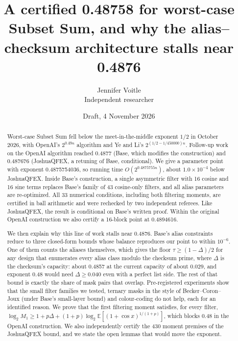 \documentclass[11pt]{article}
\newcommand{\E}{\mathbb{E}}
\theoremstyle{plain}
\begin{document}
\title{A certified 0.48758 for worst-case Subset Sum, and why the alias--checksum architecture stalls near 0.4876}
\author{Jennifer Voitle\\ Independent researcher}
\date{Draft, 4 November 2026}

\maketitle

\begin{abstract}
Worst-case Subset Sum fell below the meet-in-the-middle exponent $1/2$ in October 2026, with OpenAI's $2^{0.49n}$ algorithm and Ye and Li's $2^{(1/2 - 1/450000)n}$. Follow-up work on the OpenAI algorithm reached 0.4877 (Base, which modifies the construction) and 0.487676 (JoshuaQFEX, a retuning of Base, conditional). We give a parameter point with exponent 0.4875754036, so running time $O(2^{0.4875755n})$, about $1.0\times10^{-4}$ below JoshuaQFEX. Inside Base's construction, a single asymmetric filter with 16 cosine and 16 sine terms replaces Base's family of 43 cosine-only filters, and all alias parameters are re-optimized. All 33 numerical conditions, including both filtering moments, are certified in ball arithmetic and were rechecked by two independent referees. Like JoshuaQFEX, the result is conditional on Base's written proof. Within the original OpenAI construction we also certify a 16-block point at 0.4894616.

We then explain why this line of work stalls near 0.4876. Base's alias constraints reduce to three closed-form bounds whose balance reproduces our point to within $10^{-6}$. One of them counts the aliases themselves, which gives the floor $\tau \ge (1 - \Delta)/2$ for any design that enumerates every alias class modulo the checksum prime, where $\Delta$ is the checksum's capacity: about 0.4857 at the current capacity of about 0.029, and exponent 0.48 would need $\Delta \ge 0.040$ even with a perfect list side. The rest of that bound is exactly the share of mask pairs that overlap. Pre-registered experiments show that the small filter families we tested, ternary masks in the style of Becker--Coron--Joux (under Base's small-layer bound) and colour-coding do not help, each for an identified reason. We prove that the first filtering moment satisfies, for every filter, $\log_2 M_1 \ge 1 + p\Delta + (1+p) \log_2 \E[(1+\cos x)^{1/(1+p)}]$, which blocks 0.48 in the OpenAI construction. We also independently certify the 430 moment premises of the JoshuaQFEX bound, and we state the open lemmas that would move the exponent.
\end{abstract}
\end{document}
